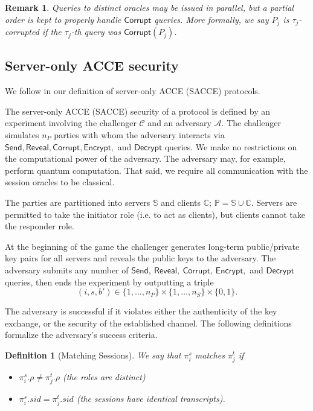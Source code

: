 \documentclass[USenglish,oneside,twocolumn]{article}
\theoremstyle{dgthm}
\theoremstyle{dgdef}
\newtheorem{definition}[theorem]{Definition}
\newtheorem{remark}[theorem]{Remark}
\newcommand{\p}[2]{\pi_{#1}^{#2}}
\newcommand{\Oracle}[1]{\mathcal #1}
\newcommand{\AdvInt}[1]{\mathsf{#1}}
\newcommand{\Corrupt}{\AdvInt{Corrupt}}
\newcommand{\Reveal}{\AdvInt{Reveal}}
\newcommand{\Send}{\AdvInt{Send}}
\newcommand{\Encrypt}{\AdvInt{Encrypt}}
\newcommand{\Decrypt}{\AdvInt{Decrypt}}
\begin{document}
    \begin{remark}
    Queries to distinct oracles may be issued in parallel, but a partial order
    is kept to properly handle $\Corrupt$ queries. More formally, we say $P_j$ is
    $\tau_j$-corrupted if the $\tau_j$-th query was $\Corrupt(P_j)$.
    \end{remark}

  \subsection{Server-only ACCE security}\label{sec:sacceexp}
    We follow \cite{Krawczyk2013} in our definition of server-only ACCE (SACCE)
    protocols.

    The server-only ACCE (SACCE) security of a protocol is defined by an
    experiment involving the challenger $\Oracle{C}$ and an adversary
    $\Oracle{A}$. The challenger simulates $n_P$ parties with whom the
    adversary interacts via $\Send, \Reveal, \Corrupt, \Encrypt,$ and
    $\Decrypt$ queries. We make no restrictions on the computational power of
    the adversary. The adversary may, for example, perform quantum computation.
    That said, we require all communication with the session oracles to be
    classical.

    The parties are partitioned into servers $\mathbb{S}$ and clients
    $\mathbb{C}$; $\mathbb{P} = \mathbb{S} \cup \mathbb{C}$. Servers are
    permitted to take the initiator role (i.e. to act as clients), but clients
    cannot take the responder role.

    At the beginning of the game the challenger generates long-term
    public/private key pairs for all servers and reveals the public keys to the
    adversary. The adversary submits any number of $\Send,~\Reveal,~\Corrupt,~
    \Encrypt,$ and $\Decrypt$ queries, then ends the experiment by outputting a
    triple \[(i, s, b') \in \{1, \dots, n_P\} \times \{1, \dots, n_S\} \times \{0,1\}.\]

    The adversary is successful if it violates either the authenticity of the
    key exchange, or the security of the established channel. The following
    definitions formalize the adversary's success criteria.

    \begin{definition}[Matching Sessions]\label{def:ms}
      We say that $\p i s$ matches $\p j t$ if
      \begin{itemize}
        \item $\p{i}{s}.\rho \ne \p{j}{t}.\rho$ (the roles are distinct)
        \item $\p{i}{s}.sid = \p{j}{t}.sid$ (the sessions have identical transcripts).
      \end{itemize}
    \end{definition}
\end{document}
